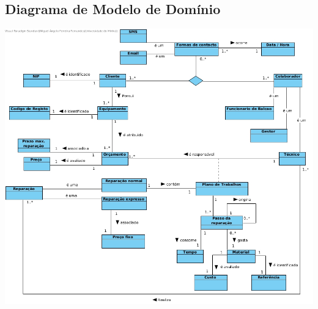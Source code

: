 \documentclass[a4paper, 12pt]{report}
\begin{document}





\subsection{Diagrama de Modelo de Domínio} %

\includegraphics[scale=0.41]{Modelo.jpg}
\end{document}
